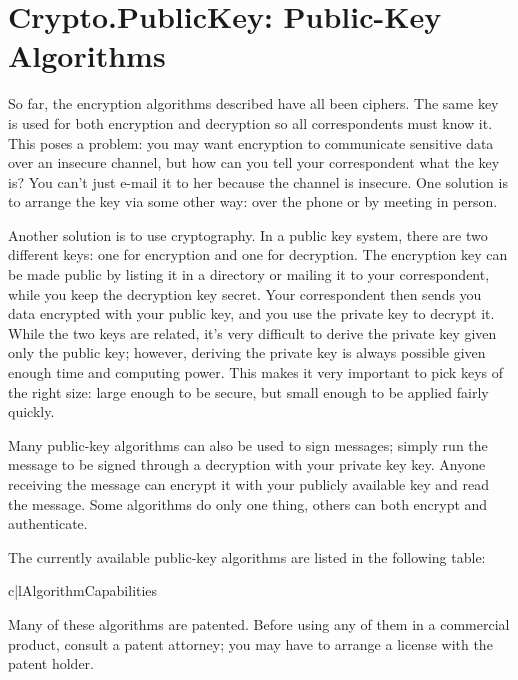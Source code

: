 \documentclass{howto}
\begin{document}
\section{Crypto.PublicKey: Public-Key Algorithms}
So far, the encryption algorithms described have all been  ciphers.  The same key is used for both encryption and decryption
so all correspondents must know it.  This poses a problem: you may
want encryption to communicate sensitive data over an insecure
channel, but how can you tell your correspondent what the key is?  You
can't just e-mail it to her because the channel is insecure.  One
solution is to arrange the key via some other way: over the phone or
by meeting in person.

Another solution is to use  cryptography.  In a public
key system, there are two different keys: one for encryption and one for
decryption.  The encryption key can be made public by listing it in a
directory or mailing it to your correspondent, while you keep the
decryption key secret.  Your correspondent then sends you data encrypted
with your public key, and you use the private key to decrypt it.  While
the two keys are related, it's very difficult to derive the private key
given only the public key; however, deriving the private key is always
possible given enough time and computing power.  This makes it very
important to pick keys of the right size: large enough to be secure, but
small enough to be applied fairly quickly.

Many public-key algorithms can also be used to sign messages; simply
run the message to be signed through a decryption with your private
key key.  Anyone receiving the message can encrypt it with your
publicly available key and read the message.  Some algorithms do only
one thing, others can both encrypt and authenticate.

The currently available public-key algorithms are listed in the
following table:

\begin{tableii}{c|l}{}{Algorithm}{Capabilities}
\end{tableii}

Many of these algorithms are patented.  Before using any of them in a
commercial product, consult a patent attorney; you may have to arrange
a license with the patent holder.
\end{document}

